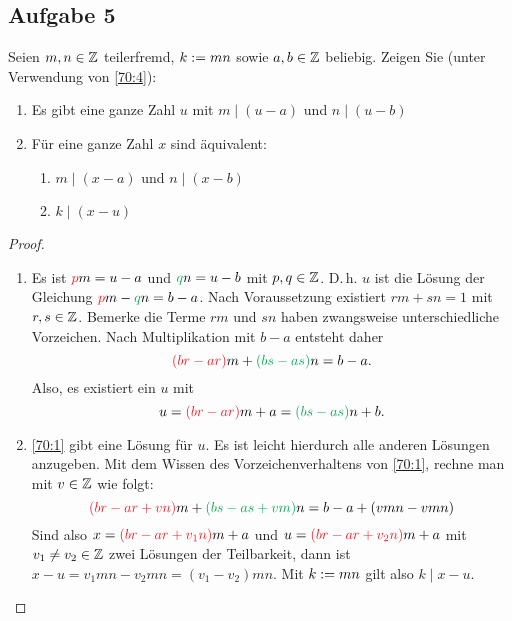 \subsection{Aufgabe 5}
Seien $m,n \in \mathbb{Z}$ teilerfremd, $k := mn$ sowie
$a,b \in \mathbb{Z}$ beliebig. Zeigen Sie (unter Verwendung von \autoref{70:4}):
\begin{enumerate}[label=\alph*)]
  \item Es gibt eine ganze Zahl $u$ mit $m \mid (u - a)$ und $n \mid (u - b)$
  \item Für eine ganze Zahl $x$ sind äquivalent:
        \begin{enumerate}[label=\roman*)]
          \item $m \mid (x - a)$ und $n \mid (x - b)$
          \item $k \mid (x - u)$
        \end{enumerate}
\end{enumerate}
\begin{proof}
  \begin{enumerate}[label=\alph*)]
    \item Es ist $\textcolor{Red}{p}m = u - a$ und
          $\textcolor{Green}{q}n = u - b$ mit $p,q \in \mathbb{Z}$.
          D.\,h. $u$ ist die Lösung der Gleichung
          $\textcolor{Red}{p}m - \textcolor{Green}{q}n = b - a$.
          Nach Voraussetzung existiert $rm + sn = 1$ mit $r,s \in \mathbb{Z}$.
          Bemerke die Terme $rm$ und $sn$ haben zwangsweise
          unterschiedliche Vorzeichen. Nach Multiplikation mit
          $b - a$ entsteht daher
          \begin{equation}
            \label{70:1}
            \textcolor{Red}{(br - ar)}m + \textcolor{Green}{(bs - as)}n = b - a.
          \end{equation}
          Also, es existiert ein $u$ mit
          \begin{equation*}
            u = \textcolor{Red}{(br - ar)}m + a = \textcolor{Green}{(bs - as)}n + b.
          \end{equation*}
    \item \autoref{70:1} gibt eine Lösung für $u$.
          Es ist leicht hierdurch alle anderen Lösungen anzugeben.
          Mit dem Wissen des Vorzeichenverhaltens von \eqref{70:1},
          rechne man mit $v \in \mathbb{Z}$ wie folgt:
          \begin{equation*}
            \textcolor{Red}{(br - ar + vn)}m + \textcolor{Green}{(bs - as + vm)}n
            = b - a + (vmn - vmn)
          \end{equation*}
          Sind also $x = \textcolor{Red}{(br - ar + v_1n)}m + a$ und
          $u = \textcolor{Red}{(br - ar + v_2n)}m + a$ mit $v_1 \neq v_2 \in \mathbb{Z}$
          zwei Lösungen der Teilbarkeit,
          dann ist $x - u = v_1mn - v_2mn = (v_1 - v_2)mn$.
          Mit $k := mn$ gilt also $k \mid x - u$.
  \end{enumerate}
\end{proof}

